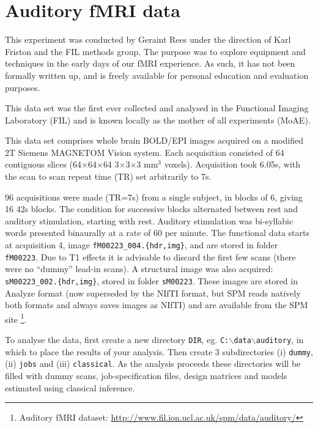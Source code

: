 \chapter{Auditory fMRI data \label{Chap:data:auditory}}
 
This experiment was conducted by Geraint Rees under the direction of Karl Friston and the FIL methods group. The purpose was to explore equipment and techniques in the early days of our fMRI experience. As such, it has not been formally written up, and is freely available for personal education and evaluation purposes.

This data set was the first ever collected and analysed in the Functional Imaging Laboratory (FIL) and is known locally as the mother of all experiments (MoAE).

This data set comprises whole brain BOLD/EPI images acquired on a modified 2T Siemens MAGNETOM Vision system. Each acquisition consisted of 64 contiguous slices (64$\times$64$\times$64 3$\times$3$\times$3 mm$^3$ voxels). Acquisition took 6.05s, with the scan to scan repeat time (TR) set arbitrarily to 7s.

96 acquisitions were made (TR=7s) from a single subject, in blocks of 6, giving 16 42s blocks. The condition for successive blocks alternated between rest and auditory stimulation, starting with rest. Auditory stimulation was bi-syllabic words presented binaurally at a rate of 60 per minute. The functional data starts at acquisition 4, image \texttt{fM00223\_004.\{hdr,img\}}, and are stored in folder \texttt{fM00223}. Due to T1 effects it is advisable to discard the first few scans (there were no ``dummy'' lead-in scans). A structural image was also acquired: \texttt{sM00223\_002.\{hdr,img\}}, stored in folder \texttt{sM00223}. These images are stored in Analyze format (now superseded by the NIfTI format, but SPM reads natively both formats and always saves images as NIfTI) and are available from the SPM site \footnote{Auditory fMRI dataset: \url{http://www.fil.ion.ucl.ac.uk/spm/data/auditory/}}.

To analyse the data, first create a new directory \texttt{DIR},  eg. \texttt{C:$\backslash$data$\backslash$auditory}, in which to place the results of your analysis. Then create 3 subdirectories (i) \texttt{dummy}, (ii) \texttt{jobs} and (iii) \texttt{classical}. As the analysis proceeds these directories will be filled with dummy scans, job-specification files, design matrices and models estimated using classical inference.

